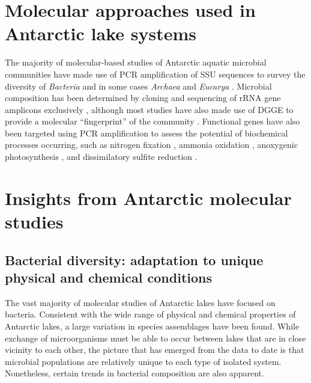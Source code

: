 \section{Molecular approaches used in Antarctic lake systems}
\label{in:mol}
The majority of molecular-based studies of Antarctic aquatic microbial communities have made use of \ac{PCR} amplification of \ac{SSU} sequences to survey the diversity of \emph{Bacteria}
 and in some cases \emph{Archaea} and \emph{Eucarya} .
Microbial composition has been determined by cloning and sequencing of \ac{rRNA} gene amplicons exclusively 
\cite{Bowman2000a, Bowman2000, Gordon2000, Christner2001, Purdy2003, Karr2006, Matsuzaki2006, Kurosawa2010, Bielewicz2011}, 
although most studies have also made use of \ac{DGGE} to provide a molecular ``fingerprint'' of the community 
\cite{Pearce2003a, Pearce2003b, Karr2005, Pearce2005a, Pearce2005b, Unrein2005, Glatz2006, Mikucki2007, Mosier2007, Schiaffino2009, Villaescusa2010}.
Functional genes have also been targeted using \ac{PCR} amplification to assess the potential of biochemical processes occurring, such as nitrogen fixation \cite{Olson1998}, 
ammonia oxidation \cite{Voytek1999}, anoxygenic photosynthesis \cite{Karr2003}, and dissimilatory sulfite reduction \cite{Karr2005, Mikucki2009}. %



\section{Insights from Antarctic molecular studies}
\label{in:insights}
\subsection{Bacterial diversity: adaptation to unique physical and chemical conditions}
The vast majority of molecular studies of Antarctic lakes have focused on bacteria.
Consistent with the wide range of physical and chemical properties of Antarctic lakes, a large variation in species assemblages have been found.
While exchange of microorganisms must be able to occur between lakes that are in close vicinity to each other, 
the picture that has emerged from the data to date is that microbial populations are relatively unique to each type of isolated system. 
Nonetheless, certain trends in bacterial composition are also apparent.

